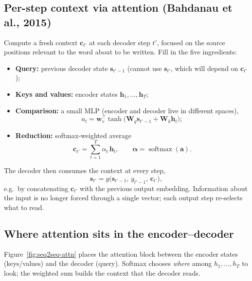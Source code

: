 \documentclass[11pt]{article}
\begin{document}
\subsection{Per-step context via attention (Bahdanau et al., 2015)}

Compute a fresh context \(\mathbf{c}_{t'}\) at each decoder step \(t'\),
focused on the source positions relevant to the word about to be written.
Fill in the five ingredients:

\begin{itemize}[leftmargin=*]
  \item \textbf{Query:} previous decoder state \(\mathbf{s}_{t'-1}\)
        (cannot use \(\mathbf{s}_{t'}\), which will depend on
        \(\mathbf{c}_{t'}\));
  \item \textbf{Keys and values:} encoder states
        \(\mathbf{h}_1,\ldots,\mathbf{h}_T\);
  \item \textbf{Comparison:} a small MLP (encoder and decoder live in
        different spaces),
        \[
          a_t
          =
          \mathbf{w}_v^\top
          \tanh\!\bigl(\mathbf{W}_q\mathbf{s}_{t'-1}
          + \mathbf{W}_k\mathbf{h}_t\bigr);
        \]
  \item \textbf{Reduction:} softmax-weighted average
        \[
          \mathbf{c}_{t'}
          =
          \sum_{t=1}^{T}\alpha_t\,\mathbf{h}_t,
          \qquad
          \boldsymbol{\alpha}=\operatorname{softmax}(\mathbf{a}).
        \]
\end{itemize}

The decoder then consumes the context at every step,
\[
  \mathbf{s}_{t'}
  =
  g\bigl(\mathbf{s}_{t'-1},\, y_{t'-1},\, \mathbf{c}_{t'}\bigr),
\]
e.g.\ by concatenating \(\mathbf{c}_{t'}\) with the previous output embedding.
Information about the input is no longer forced through a single vector;
each output step re-selects what to read.

\subsection{Where attention sits in the encoder--decoder}

Figure~\ref{fig:seq2seq-attn} places the attention block between the
encoder states (keys/values) and the decoder (query). Softmax chooses
\emph{where} among \(h_1,\ldots,h_T\) to look; the weighted sum builds the
context that the decoder reads.
\end{document}
